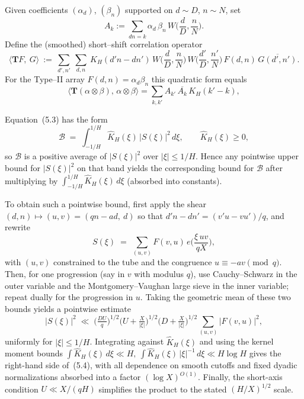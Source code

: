 Given coefficients $(\alpha_d)$, $(\beta_n)$ supported on $d\sim D$, $n\sim N$, set
\begin{equation}\label{eq:Ak.def}
A_k := \sum_{dn=k} \alpha_d\,\beta_n\,
W\!\Big(\frac{d}{D},\frac{n}{N}\Big).
\end{equation}
Define the (smoothed) short–shift correlation operator
\begin{equation}\label{eq:BG.kernel}
\langle \mathbf T F,\ G\rangle \ :=\
\sum_{d',n'}\ \sum_{d,n}\ K_H(d'n - dn')\,
W\!\Big(\frac{d}{D},\frac{n}{N}\Big)\,W\!\Big(\frac{d'}{D},\frac{n'}{N}\Big)\,
F(d,n)\,\overline{G(d',n')}.
\end{equation}
For the Type–II array $F(d,n)=\alpha_d\beta_n$ this quadratic form equals
\[
\langle \mathbf T(\alpha\!\otimes\!\beta),\,\alpha\!\otimes\!\beta \rangle
=\sum_{k,k'} A_{k'}\,\overline{A_k}\,K_H(k'-k),
\]
\begin{remark}[Justification]\label{rem:justification-53-54}
Equation~(5.3) has the form
\[
\mathcal B \;=\; \int_{-1/H}^{1/H} \widehat K_H(\xi)\,\bigl|S(\xi)\bigr|^2\,d\xi,
\qquad \widehat K_H(\xi)\ge 0,
\]
so $\mathcal B$ is a positive average of $\lvert S(\xi)\rvert^2$ over $|\xi|\le 1/H$. Hence any pointwise upper bound for $\lvert S(\xi)\rvert^2$ on that band yields the corresponding bound for $\mathcal B$ after multiplying by $\int_{-1/H}^{1/H}\widehat K_H(\xi)\,d\xi$ (absorbed into constants).

To obtain such a pointwise bound, first apply the shear $(d,n)\mapsto(u,v)=(qn-ad,\ d)$ so that $d'n-dn'=(v'u-vu')/q$, and rewrite
\[
S(\xi)\;=\;\sum_{(u,v)} F(v,u)\,e\!\Big(\frac{\xi\,u v}{qX}\Big),
\]
with $(u,v)$ constrained to the tube and the congruence $u\equiv -av\pmod q$. Then, for one progression (say in $v$ with modulus $q$), use Cauchy--Schwarz in the outer variable and the Montgomery--Vaughan large sieve in the inner variable; repeat dually for the progression in $u$. Taking the geometric mean of these two bounds yields a pointwise estimate
\[
|S(\xi)|^2 \;\ll\; \Big(\tfrac{DU}{q}\Big)^{1/2}
\Big(U+\tfrac{X}{|\xi|}\Big)^{1/2}\Big(D+\tfrac{X}{|\xi|}\Big)^{1/2}
\sum_{(u,v)} |F(v,u)|^2,
\]
uniformly for $|\xi|\le 1/H$. Integrating against $\widehat K_H(\xi)$ and using the kernel moment bounds
\(
\int\widehat K_H(\xi)\,d\xi\ll H,\ 
\int \widehat K_H(\xi)\,|\xi|^{-1}\,d\xi\ll H\log H
\)
gives the right-hand side of~(5.4), with all dependence on smooth cutoffs and fixed dyadic normalizations absorbed into a factor $(\log X)^{O(1)}$. Finally, the short-axis condition $U\ll X/(qH)$ simplifies the product to the stated $(H/X)^{1/2}$ scale.
\end{remark}

